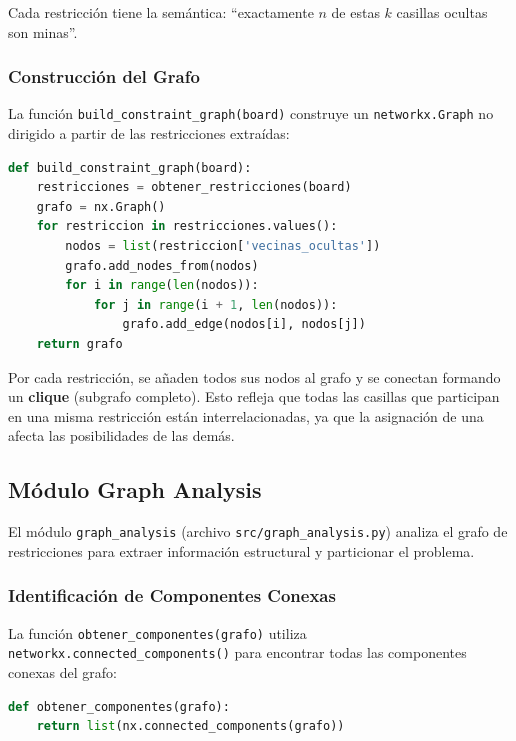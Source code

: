 \documentclass[12pt,a4paper]{article}
\begin{document}
Cada restricción tiene la semántica: ``exactamente $n$ de estas $k$ casillas ocultas son minas''.

\subsubsection{Construcción del Grafo}

La función \texttt{build\_constraint\_graph(board)} construye un \texttt{networkx.Graph} no dirigido a partir de las restricciones extraídas:

\begin{lstlisting}[language=Python, caption={Construcción del grafo de restricciones.}]
def build_constraint_graph(board):
    restricciones = obtener_restricciones(board)
    grafo = nx.Graph()
    for restriccion in restricciones.values():
        nodos = list(restriccion['vecinas_ocultas'])
        grafo.add_nodes_from(nodos)
        for i in range(len(nodos)):
            for j in range(i + 1, len(nodos)):
                grafo.add_edge(nodos[i], nodos[j])
    return grafo
\end{lstlisting}

Por cada restricción, se añaden todos sus nodos al grafo y se conectan formando un \textbf{clique} (subgrafo completo). Esto refleja que todas las casillas que participan en una misma restricción están interrelacionadas, ya que la asignación de una afecta las posibilidades de las demás.

\subsection{Módulo Graph Analysis}

El módulo \texttt{graph\_analysis} (archivo \texttt{src/graph\_analysis.py}) analiza el grafo de restricciones para extraer información estructural y particionar el problema.

\subsubsection{Identificación de Componentes Conexas}

La función \texttt{obtener\_componentes(grafo)} utiliza \texttt{networkx.connected\_components()} para encontrar todas las componentes conexas del grafo:

\begin{lstlisting}[language=Python, caption={Obtención de componentes conexas.}]
def obtener_componentes(grafo):
    return list(nx.connected_components(grafo))
\end{lstlisting}
\end{document}
